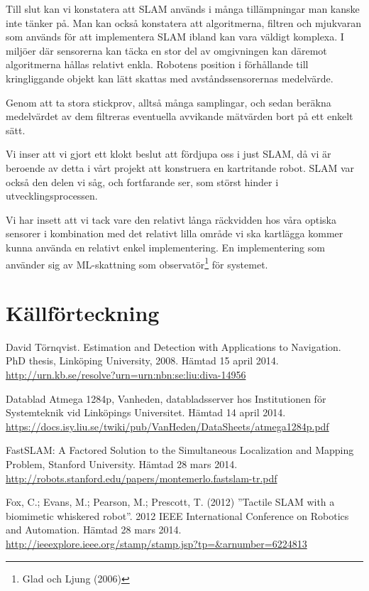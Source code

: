 \documentclass[a4paper,12pt,fleqn]{article}
\begin{document}
Till slut kan vi konstatera att SLAM används i många tillämpningar man kanske inte tänker på. Man kan också konstatera att algoritmerna, filtren och mjukvaran som används för att implementera SLAM ibland kan vara väldigt komplexa. I miljöer där sensorerna kan täcka en stor del av omgivningen kan däremot algoritmerna hållas relativt enkla. Robotens position i förhållande till kringliggande objekt kan lätt skattas med avståndssensorernas medelvärde. 

Genom att ta stora stickprov, alltså många samplingar, och sedan beräkna medelvärdet av dem filtreras eventuella avvikande mätvärden bort på ett enkelt sätt. 

Vi inser att vi gjort ett klokt beslut att fördjupa oss i just SLAM, då vi är beroende av detta i vårt projekt att konstruera en kartritande robot. SLAM var också den delen vi såg, och fortfarande ser, som störst hinder i utvecklingsprocessen. 

Vi har insett att vi tack vare den relativt långa räckvidden hos våra optiska sensorer i kombination med det relativt lilla område vi ska kartlägga kommer kunna använda en relativt enkel implementering. En implementering som använder sig av ML-skattning som observatör\footnote{Glad och Ljung (2006)} för systemet. 

\newpage 
\section*{Källförteckning} 

David Törnqvist. Estimation and Detection with Applications to Navigation. PhD thesis, Linköping University, 2008. Hämtad 15 april 2014.
\url{http://urn.kb.se/resolve?urn=urn:nbn:se:liu:diva-14956}

Datablad Atmega 1284p, Vanheden, databladsserver hos Institutionen för Systemteknik vid Linköpings Universitet. Hämtad 14 april 2014. \url{https://docs.isy.liu.se/twiki/pub/VanHeden/DataSheets/atmega1284p.pdf}

FastSLAM: A Factored Solution to the Simultaneous
Localization and Mapping Problem, Stanford University. Hämtad 28 mars 2014.
\url{http://robots.stanford.edu/papers/montemerlo.fastslam-tr.pdf}

Fox, C.; Evans, M.; Pearson, M.; Prescott, T. (2012)
''Tactile SLAM with a biomimetic whiskered robot''. 2012 IEEE International Conference on Robotics and Automation. Hämtad 28 mars 2014.
\url{http://ieeexplore.ieee.org/stamp/stamp.jsp?tp=&arnumber=6224813}
\end{document}
